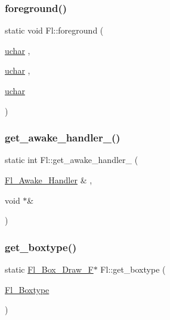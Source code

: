 \mbox{\label{class_fl_abeb96b2a9d16f43eab70a461e9f64f52}} 
\subsubsection{\texorpdfstring{foreground()}{foreground()}}
{\footnotesize\ttfamily static void Fl\+::foreground (\begin{DoxyParamCaption}\item[{\hyperlink{fl__types_8h_a65f85814a8290f9797005d3b28e7e5fc}{uchar}}]{,  }\item[{\hyperlink{fl__types_8h_a65f85814a8290f9797005d3b28e7e5fc}{uchar}}]{,  }\item[{\hyperlink{fl__types_8h_a65f85814a8290f9797005d3b28e7e5fc}{uchar}}]{ }\end{DoxyParamCaption})\hspace{0.3cm}{\ttfamily [static]}}

\mbox{\label{class_fl_a1ebc15e089226ac9dc79e675efa27131}} 
\subsubsection{\texorpdfstring{get\+\_\+awake\+\_\+handler\+\_\+()}{get\_awake\_handler\_()}}
{\footnotesize\ttfamily static int Fl\+::get\+\_\+awake\+\_\+handler\+\_\+ (\begin{DoxyParamCaption}\item[{\hyperlink{group__callback__functions_ga28b44ff2052ca0b06d0da852fadd42c0}{Fl\+\_\+\+Awake\+\_\+\+Handler} \&}]{,  }\item[{void $\ast$\&}]{ }\end{DoxyParamCaption})\hspace{0.3cm}{\ttfamily [static]}}

\mbox{\label{class_fl_a974a79cf7b0cd267defe5e820a332973}} 
\subsubsection{\texorpdfstring{get\+\_\+boxtype()}{get\_boxtype()}}
{\footnotesize\ttfamily static \hyperlink{group__callback__functions_gacb24a62f521a0e02cd7872a3bfbf3855}{Fl\+\_\+\+Box\+\_\+\+Draw\+\_\+F}$\ast$ Fl\+::get\+\_\+boxtype (\begin{DoxyParamCaption}\item[{\hyperlink{_enumerations_8_h_ae48bf9070f8541de17829f54ccacc6bc}{Fl\+\_\+\+Boxtype}}]{ }\end{DoxyParamCaption})\hspace{0.3cm}{\ttfamily [static]}}

